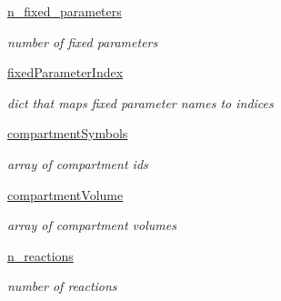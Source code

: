 \begin{DoxyCompactItemize}
\mbox{\hyperlink{classamici_1_1sbml__import_1_1_sbml_importer_a6a5a041dbfdb024168192e0418388b15}{n\+\_\+fixed\+\_\+parameters}}
\begin{DoxyCompactList}\small\item\em number of fixed parameters \end{DoxyCompactList}\item 
\mbox{\label{classamici_1_1sbml__import_1_1_sbml_importer_ae2118a6ed7469f30fad86a93753d28ee}} 
\mbox{\hyperlink{classamici_1_1sbml__import_1_1_sbml_importer_ae2118a6ed7469f30fad86a93753d28ee}{fixed\+Parameter\+Index}}
\begin{DoxyCompactList}\small\item\em dict that maps fixed parameter names to indices \end{DoxyCompactList}\item 
\mbox{\label{classamici_1_1sbml__import_1_1_sbml_importer_a2aff5108febc22bf2d9981ecd7ed6101}} 
\mbox{\hyperlink{classamici_1_1sbml__import_1_1_sbml_importer_a2aff5108febc22bf2d9981ecd7ed6101}{compartment\+Symbols}}
\begin{DoxyCompactList}\small\item\em array of compartment ids \end{DoxyCompactList}\item 
\mbox{\label{classamici_1_1sbml__import_1_1_sbml_importer_a3e59ec3eb7dfa84613784e0d24dc3e4b}} 
\mbox{\hyperlink{classamici_1_1sbml__import_1_1_sbml_importer_a3e59ec3eb7dfa84613784e0d24dc3e4b}{compartment\+Volume}}
\begin{DoxyCompactList}\small\item\em array of compartment volumes \end{DoxyCompactList}\item 
\mbox{\label{classamici_1_1sbml__import_1_1_sbml_importer_a9ea520c6a00a72f45a35fb67a9c19ade}} 
\mbox{\hyperlink{classamici_1_1sbml__import_1_1_sbml_importer_a9ea520c6a00a72f45a35fb67a9c19ade}{n\+\_\+reactions}}
\begin{DoxyCompactList}\small\item\em number of reactions \end{DoxyCompactList}\item 

\end{DoxyCompactItemize}
